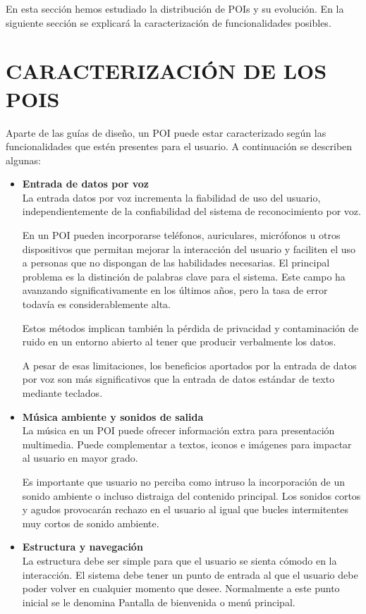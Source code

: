 En esta sección hemos estudiado la distribución de POIs y su evolución. En la
siguiente sección se explicará la caracterización de funcionalidades posibles.

\section{\uppercase{Caracterización de los POIs}}

Aparte de las guías de diseño, un POI puede estar caracterizado según las
funcionalidades que estén presentes para el usuario. A continuación se describen
algunas:

\begin{itemize}
  \item{\textbf{Entrada de datos por voz}\\
  La entrada datos por voz incrementa la fiabilidad de uso del
usuario\cite{Mag07}, independientemente de la confiabilidad del sistema de
reconocimiento por voz.

En un POI pueden incorporarse teléfonos, auriculares, micrófonos u otros
dispositivos que permitan mejorar la interacción del usuario y faciliten el uso
a personas que no dispongan de las habilidades necesarias. El principal problema
es la distinción de palabras clave para el sistema. Este campo ha 
avanzando significativamente en los últimos años, pero la tasa de error
todavía es considerablemente alta. 

\newpage
Estos métodos implican también la pérdida
de privacidad y contaminación de ruido en un entorno abierto al tener que producir
verbalmente los datos.

A pesar de esas limitaciones, los beneficios aportados por la entrada de
datos por voz son más significativos que la entrada de datos estándar de texto
mediante teclados.
  }
  \item{\textbf{Música ambiente y sonidos de salida}\\
  La música en un POI puede ofrecer información extra\cite{Mag07} para
  presentación multimedia. Puede complementar a textos, iconos e imágenes para
impactar al usuario en mayor grado.

Es importante que usuario no perciba como intruso la incorporación de un sonido
ambiente o incluso distraiga del contenido principal. Los sonidos cortos y
agudos provocarán rechazo en el usuario al igual que bucles intermitentes muy
cortos de sonido ambiente.
  }
  \item{\textbf{Estructura y navegación}\\
  La estructura debe ser simple\cite{LoM99} para que el usuario se sienta cómodo
  en la interacción. El sistema debe tener un punto de entrada al que el usuario debe
poder volver en cualquier momento que desee. Normalmente a este punto inicial se
le denomina Pantalla de bienvenida o menú principal.

}
\end{itemize}
